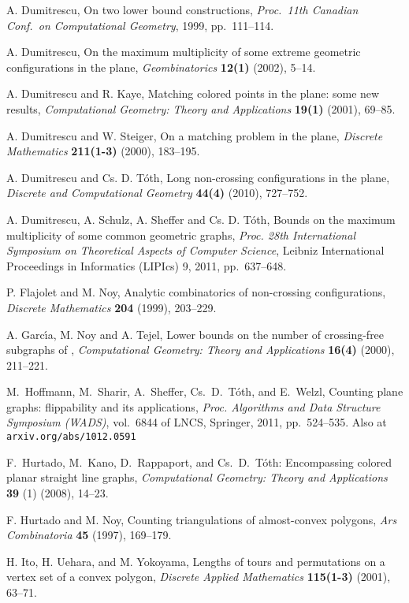 \documentclass[11pt]{article}
\begin{document}
\begin{thebibliography}{99}
 A. Dumitrescu,
On two lower bound constructions,
\emph{Proc.\ 11th Canadian Conf.\ on Computational Geometry}, 
1999, pp.~111--114.

 A. Dumitrescu,
On the maximum multiplicity of some extreme geometric configurations in the plane,
{\em Geombinatorics} {\bf 12(1)} (2002), 5--14.

 A. Dumitrescu and R. Kaye,
Matching colored points in the plane: some new results,
{\em Computational Geometry: Theory and Applications}
{\bf 19(1)} (2001), 69--85.

 A. Dumitrescu and W. Steiger,
On a matching problem in the plane,
{\em Discrete Mathematics} {\bf 211(1-3)} (2000), 183--195.

 A. Dumitrescu and Cs. D. T\'oth,
Long non-crossing configurations in the plane,
{\em Discrete and Computational Geometry} {\bf 44(4)} (2010), 727--752.

 A. Dumitrescu, A. Schulz, A. Sheffer and Cs. D. T\'oth,
Bounds on the maximum multiplicity of some common geometric graphs,
\emph{Proc. 28th International Symposium on Theoretical Aspects of
  Computer Science}, Leibniz International Proceedings in Informatics
(LIPIcs) 9, 2011, pp.~637--648.


 P. Flajolet and M. Noy,
Analytic combinatorics of non-crossing configurations,
{\em Discrete Mathematics} {\bf 204} (1999), 203--229.


 A. Garc\'{\i}a, M. Noy and A. Tejel,
Lower bounds on the number of crossing-free subgraphs of ,
{\em Computational Geometry: Theory and Applications}
{\bf 16(4)} (2000), 211--221.




M.~Hoffmann, M.~Sharir, A.~Sheffer, Cs.~D.~T\'oth, and E.~Welzl,
Counting plane graphs: flippability and its applications,
{\em Proc. Algorithms and Data Structure Symposium (WADS)},
vol.~6844 of LNCS, Springer, 2011, pp.~524--535.
Also at \verb+arxiv.org/abs/1012.0591+


F.~Hurtado, M.~Kano, D.~Rappaport, and Cs.~D.~T\'oth:
Encompassing colored planar straight line graphs,
{\em Computational Geometry: Theory and Applications}
{\bf 39} (1) (2008), 14--23.

 F. Hurtado and M. Noy,
Counting triangulations of almost-convex polygons,
{\em Ars Combinatoria} {\bf 45} (1997), 169--179.


 H. Ito, H. Uehara, and M. Yokoyama,
Lengths of tours and permutations on a vertex set of a convex polygon,
{\em Discrete Applied Mathematics} {\bf 115(1-3)} (2001), 63--71.





\end{thebibliography}
\end{document}
